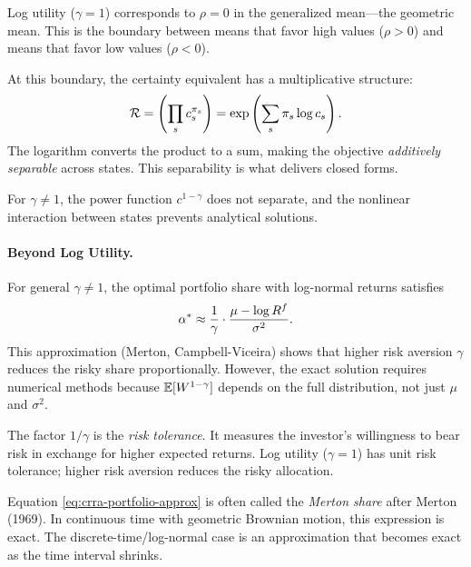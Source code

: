 \begin{calloutimportant}
Log utility ($\gamma = 1$) corresponds to $\rho = 0$ in the generalized mean---the geometric mean. This is the boundary between means that favor high values ($\rho > 0$) and means that favor low values ($\rho < 0$).

At this boundary, the certainty equivalent has a multiplicative structure:
\[
\mathcal{R} = \left( \prod_{s} c_s^{\pi_s} \right) = \exp\left( \sum_s \pi_s \log c_s \right).
\]
The logarithm converts the product to a sum, making the objective \emph{additively separable} across states. This separability is what delivers closed forms.

For $\gamma \neq 1$, the power function $c^{1-\gamma}$ does not separate, and the nonlinear interaction between states prevents analytical solutions.
\end{calloutimportant}

\paragraph{Beyond Log Utility.}

For general $\gamma \neq 1$, the optimal portfolio share with log-normal returns satisfies
\begin{equation}
\alpha^{*} \approx \frac{1}{\gamma} \cdot \frac{\mu - \log R^f}{\sigma^2}.
\label{eq:crra-portfolio-approx}
\end{equation}
This approximation (Merton, Campbell-Viceira) shows that higher risk aversion $\gamma$ reduces the risky share proportionally. However, the exact solution requires numerical methods because $\mathbb{E}[W^{1-\gamma}]$ depends on the full distribution, not just $\mu$ and $\sigma^2$.

The factor $1/\gamma$ is the \emph{risk tolerance}. It measures the investor's willingness to bear risk in exchange for higher expected returns. Log utility ($\gamma = 1$) has unit risk tolerance; higher risk aversion reduces the risky allocation.

\begin{callouttip}
Equation \eqref{eq:crra-portfolio-approx} is often called the \emph{Merton share} after Merton (1969). In continuous time with geometric Brownian motion, this expression is exact. The discrete-time/log-normal case is an approximation that becomes exact as the time interval shrinks.
\end{callouttip}

